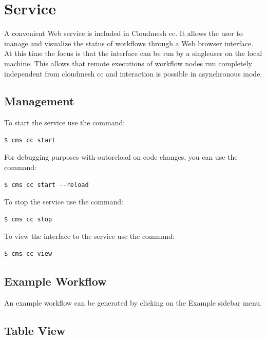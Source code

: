 
\section{Service}\label{service}

A convenient Web service is included in Cloudmesh cc. It allows the user
to manage and visualize the status of workflows through a Web browser
interface. At this time the focus is that the interface can be run by a
singleuser on the local machine. This allows that remote executions of
workflow nodes run completely independent from cloudmesh cc and
interaction is possible in asynchronous mode.

\subsection{Management}\label{management}

To start the service use the command:

\begin{verbatim}
$ cms cc start
\end{verbatim}
\smallskip

For debugging purposes with outoreload on code changes, you can use the
command:

\begin{verbatim}
$ cms cc start --reload
\end{verbatim}
\smallskip

To stop the service use the command:

\begin{verbatim}
$ cms cc stop
\end{verbatim}
\smallskip

To view the interface to the service use the command:

\begin{verbatim}
$ cms cc view
\end{verbatim}
\smallskip

\subsection{Example Workflow}\label{example-workflow}

An example workflow can be generated by clicking on the Example
sidebar menu.

\subsection{Table View}\label{table-view}

